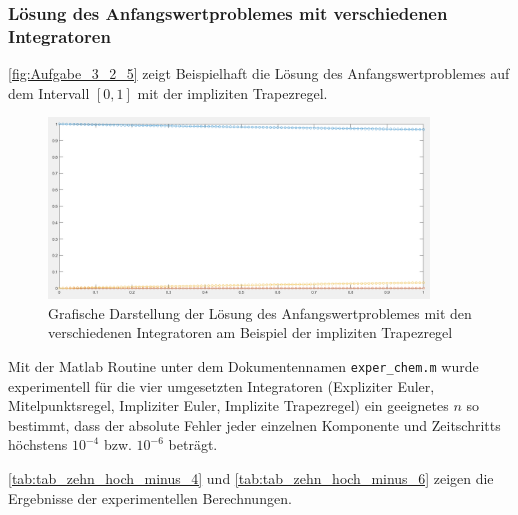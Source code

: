 \documentclass[
	pagesize,
	fontsize=12pt,
	paper=a4,
	oneside,
   reqno
]{scrartcl}
\begin{document}
\subsubsection{Lösung des Anfangswertproblemes mit verschiedenen Integratoren}

\autoref{fig:Aufgabe_3_2_5} zeigt Beispielhaft die Lösung des Anfangswertproblemes auf dem Intervall $[0,1]$ mit der impliziten Trapezregel.

\begin{figure}[H]
   \centering
   \includegraphics[width=0.9\textwidth]{Bilder/Aufgabe_3_2_5.png}
   \caption[Lösung des Anfangswertproblemes]{Grafische Darstellung der Lösung des Anfangswertproblemes mit den verschiedenen Integratoren am Beispiel der impliziten Trapezregel}
   \label{fig:Aufgabe_3_2_5}
\end{figure}

Mit der Matlab Routine unter dem Dokumentennamen \texttt{exper\_chem.m} wurde experimentell für die vier umgesetzten Integratoren (Expliziter Euler, Mitelpunktsregel, Impliziter Euler, Implizite Trapezregel) ein geeignetes $n$ so bestimmt, dass der absolute Fehler jeder einzelnen Komponente und Zeitschritts höchstens $10^{-4}$ bzw. $10^{-6}$ beträgt.

\autoref{tab:tab_zehn_hoch_minus_4} und \autoref{tab:tab_zehn_hoch_minus_6} zeigen die Ergebnisse der experimentellen Berechnungen.

\begin{table}[H]
   \centering
   \caption[$n$-Bestimmung bei max. abs. Fehler von $10^{-4}$]{Experimentelle Bestimmung von $n$ bei einem maximalen Fehler von $10^{-4}$}
   \label{tab:tab_zehn_hoch_minus_4}
\end{table}
\end{document}
